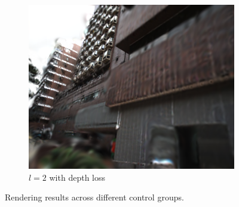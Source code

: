 \documentclass[lettersize,journal]{IEEEtran}
\begin{document}
\begin{figure}
\begin{subfigure}{0.15\textwidth}
        \label{fig:ablationwd3}
    \end{subfigure}
    \hspace{0.0001\textwidth} %
    \begin{subfigure}{0.15\textwidth}
        \includegraphics[width=\linewidth]{image/ablation/wd2.png}
        \caption{$l=2$ with depth loss}
        \label{fig:ablationwd2}
    \end{subfigure}
    \hspace{0.0001\textwidth} %
    \caption{Rendering results across different control groups.}
    \label{fig:ablation}
\end{figure}
\end{document}
